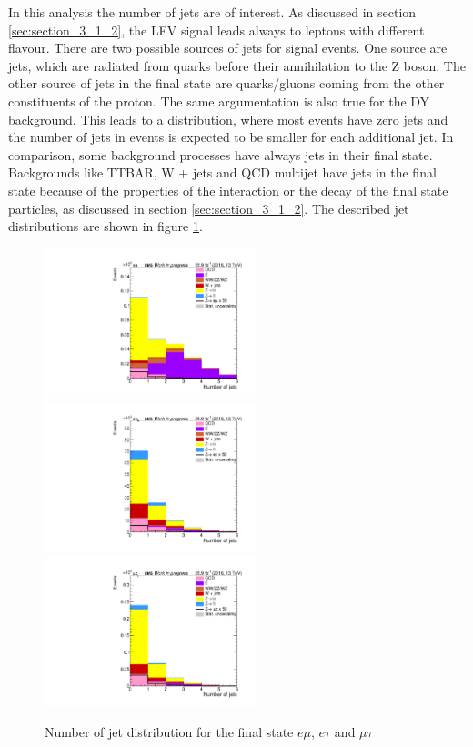 In this analysis the number of jets are of interest. As discussed in section \ref{sec:section_3_1_2}, the \gls{LFV} signal leads always to leptons with different flavour. There are two possible sources of jets for signal events. One source are jets, which are radiated from quarks before their annihilation to the Z boson. The other source of jets in the final state are quarks/gluons coming from the other constituents of the proton. The same argumentation is also true for the \gls{DY} background. This leads to a distribution, where most events have zero jets and the number of jets in events is expected to be smaller for each additional jet. In comparison, some background processes have always jets in their final state. Backgrounds like \gls{TTBAR}, W + jets and \gls{QCD} multijet have jets in the final state because of the properties of the interaction or the decay of the final state particles, as discussed in section \ref{sec:section_3_1_2}. The described jet distributions are shown in figure \ref{fig:fig_3_7}. \\

\begin{figure}[htp]
	\centering
	\includegraphics[width=0.55\textwidth]{plots/em/NumberOfJets.pdf}
	\includegraphics[width=0.55\textwidth]{plots/et/NumberOfJets.pdf}
	\includegraphics[width=0.55\textwidth]{plots/mt/NumberOfJets.pdf}

	\caption[Number of jet distribution of each final state]{Number of jet distribution for the final state $e\mu$, $e\tau$ and $\mu\tau$}
	\label{fig:fig_3_7}
\end{figure}

